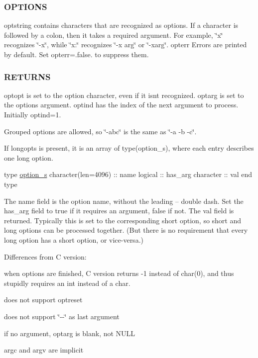 \subsubsection*{O\+P\+T\+I\+O\+NS}

optstring contains characters that are recognized as options. If a character is followed by a colon, then it takes a required argument. For example, \char`\"{}x\char`\"{} recognizes \char`\"{}-\/x\char`\"{}, while \char`\"{}x\+:\char`\"{} recognizes \char`\"{}-\/x arg\char`\"{} or \char`\"{}-\/xarg\char`\"{}. opterr Errors are printed by default. Set opterr=.false. to suppress them.

\subsubsection*{R\+E\+T\+U\+R\+NS}

optopt is set to the option character, even if it isn\textquotesingle{}t recognized. optarg is set to the option\textquotesingle{}s argument. optind has the index of the next argument to process. Initially optind=1.

Grouped options are allowed, so \char`\"{}-\/abc\char`\"{} is the same as \char`\"{}-\/a -\/b -\/c\char`\"{}.

If longopts is present, it is an array of type(option\+\_\+s), where each entry describes one long option.

type \hyperlink{structm__getopt_1_1option__s}{option\+\_\+s} character(len=4096) \+:\+: name logical \+:\+: has\+\_\+arg character \+:\+: val end type

The name field is the option name, without the leading -- double dash. Set the has\+\_\+arg field to true if it requires an argument, false if not. The val field is returned. Typically this is set to the corresponding short option, so short and long options can be processed together. (But there is no requirement that every long option has a short option, or vice-\/versa.)

Differences from C version\+:
\begin{DoxyItemize}
\item when options are finished, C version returns -\/1 instead of char(0), and thus stupidly requires an int instead of a char.
\item does not support optreset
\item does not support \char`\"{}-\/-\/\char`\"{} as last argument
\item if no argument, optarg is blank, not N\+U\+LL
\item argc and argv are implicit
\end{DoxyItemize}

